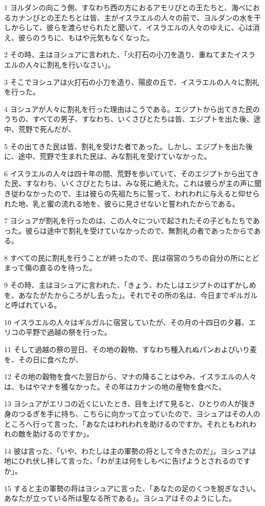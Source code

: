 \par 1 ヨルダンの向こう側、すなわち西の方におるアモリびとの王たちと、海べにおるカナンびとの王たちとは皆、主がイスラエルの人々の前で、ヨルダンの水を干しからして、彼らを渡らせられたと聞いて、イスラエルの人々のゆえに、心は消え、彼らのうちに、もはや元気もなくなった。
\par 2 その時、主はヨシュアに言われた、「火打石の小刀を造り、重ねてまたイスラエルの人々に割礼を行いなさい」。
\par 3 そこでヨシュアは火打石の小刀を造り、陽皮の丘で、イスラエルの人々に割礼を行った。
\par 4 ヨシュアが人々に割礼を行った理由はこうである。エジプトから出てきた民のうちの、すべての男子、すなわち、いくさびとたちは皆、エジプトを出た後、途中、荒野で死んだが、
\par 5 その出てきた民は皆、割礼を受けた者であった。しかし、エジプトを出た後に、途中、荒野で生まれた民は、みな割礼を受けていなかった。
\par 6 イスラエルの人々は四十年の間、荒野を歩いていて、そのエジプトから出てきた民、すなわち、いくさびとたちは、みな死に絶えた。これは彼らが主の声に聞き従わなかったので、主は彼らの先祖たちに誓って、われわれに与えると仰せられた地、乳と蜜の流れる地を、彼らに見させないと誓われたからである。
\par 7 ヨシュアが割礼を行ったのは、この人々についで起されたその子どもたちであった。彼らは途中で割礼を受けていなかったので、無割礼の者であったからである。
\par 8 すべての民に割礼を行うことが終ったので、民は宿営のうちの自分の所にとどまって傷の直るのを待った。
\par 9 その時、主はヨシュアに言われた、「きょう、わたしはエジプトのはずかしめを、あなたがたからころがし去った」。それでその所の名は、今日までギルガルと呼ばれている。
\par 10 イスラエルの人々はギルガルに宿営していたが、その月の十四日の夕暮、エリコの平野で過越の祭を行った。
\par 11 そして過越の祭の翌日、その地の穀物、すなわち種入れぬパンおよびいり麦を、その日に食べたが、
\par 12 その地の穀物を食べた翌日から、マナの降ることはやみ、イスラエルの人々は、もはやマナを獲なかった。その年はカナンの地の産物を食べた。
\par 13 ヨシュアがエリコの近くにいたとき、目を上げて見ると、ひとりの人が抜き身のつるぎを手に持ち、こちらに向かって立っていたので、ヨシュアはその人のところへ行って言った、「あなたはわれわれを助けるのですか。それともわれわれの敵を助けるのですか」。
\par 14 彼は言った、「いや、わたしは主の軍勢の将として今きたのだ」。ヨシュアは地にひれ伏し拝して言った、「わが主は何をしもべに告げようとされるのですか」。
\par 15 すると主の軍勢の将はヨシュアに言った、「あなたの足のくつを脱ぎなさい。あなたが立っている所は聖なる所である」。ヨシュアはそのようにした。

